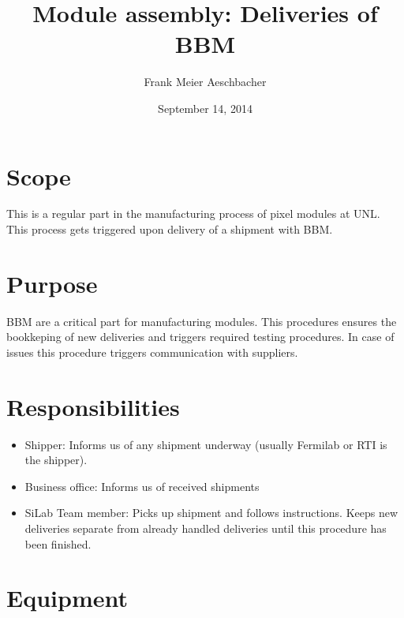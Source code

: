 \documentclass[12pt]{unlsilabsop}
\title{Module assembly: Deliveries of BBM}
\date{September 14, 2014}
\author{Frank Meier Aeschbacher}
\begin{document}
\maketitle

\section{Scope}
This is a regular part in the manufacturing process of pixel modules at UNL. This process gets triggered upon delivery of a shipment with BBM.

\section{Purpose}
BBM are a critical part for manufacturing modules. This procedures ensures the bookkeping of new deliveries and triggers required testing procedures. In case of issues this procedure triggers communication with suppliers.


\section{Responsibilities}

\begin{itemize}
    \item Shipper: Informs us of any shipment underway (usually Fermilab or RTI is the shipper).
    \item Business office: Informs us of received shipments
    \item SiLab Team member: Picks up shipment and follows instructions. Keeps new deliveries separate from already handled deliveries until this procedure has been finished.
\end{itemize}

\section{Equipment}
\end{document}
